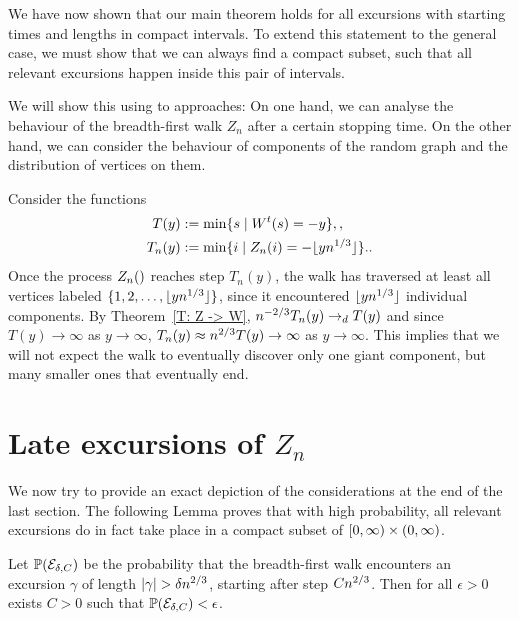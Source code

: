 We have now shown that our main theorem holds for all excursions
with starting times and lengths in compact intervals.
To extend this statement to the general case,
we must show that we can always find a compact subset,
such that all relevant excursions happen inside this pair of intervals.

We will show this using to approaches:
On one hand, we can analyse the behaviour of the breadth-first walk $Z_n$
after a certain stopping time.
On the other hand, 
we can consider the behaviour of components of the random graph
and the distribution of vertices on them.

Consider the functions
\begin{align}
T(y) &:= \min \{s \;|\; W^t(s)=-y\}, \label{E: def T(y)}, \\
T_n(y) &:= \min\{i \;|\; Z_n(i)=-\lfloor yn^{1 / 3}\rfloor \}. \label{E: def Tn(y)}.
\end{align}
Once the process $\Zn$ reaches step $T_n(y)$, 
the walk has traversed at least all vertices labeled $\{1,2,\dots,\lfloor yn^{1 / 3}\rfloor\}$,
since it encountered $\lfloor yn^{1 / 3}\rfloor$ individual components.
By Theorem~\ref{T: Z -> W}, $n^{-2 / 3}T_n(y) \rightarrow_d T(y)$
and since $T(y) \rightarrow \infty$ as $y\rightarrow\infty$,
$T_n(y) \approx n^{2 / 3}T(y) \rightarrow\infty$ as $y\rightarrow \infty$.
This implies that we will not expect the walk to eventually discover only one giant component,
but many smaller ones that eventually end.

\section{Late excursions of $Z_n$}

We now try to provide an exact depiction of the considerations at the end of the last section.
The following Lemma proves that with high probability, all relevant excursions do in fact take place in a compact subset of $[0, \infty) \times (0, \infty)$.

\begin{lemma}
	Let 
	$\mathbb{P}(\mathcal{E}_{\delta, C})$ 
	be the probability that the breadth-first walk encounters an excursion $\gamma$ of length 
	$|\gamma| > \delta n^{2 / 3}$, starting after step $Cn^{2 / 3}$.
	Then for all $\epsilon>0$ exists $C>0$ such that $\mathbb{P}(\mathcal{E}_{\delta, C}) < \epsilon$. 
\end{lemma}

